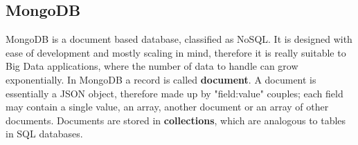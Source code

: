 \documentclass[11pt,a4paper,titlepage]{book}
\begin{document}
\subsection{MongoDB}
\begin{figure}
    \centering
    
\end{figure}
MongoDB \cite{mongodb} is a document based database, classified as NoSQL. It is designed with ease of development and mostly scaling in mind, therefore it is really suitable to Big Data applications, where the number of data to handle can grow exponentially.
\newline
\newline
In MongoDB a record is called \textbf{document}. A document is essentially a JSON object, therefore made up by "field:value" couples; each field may contain a single value, an array, another document or an array of other documents.
\newline
Documents are stored in \textbf{collections}, which are analogous to tables in SQL databases.
\end{document}
